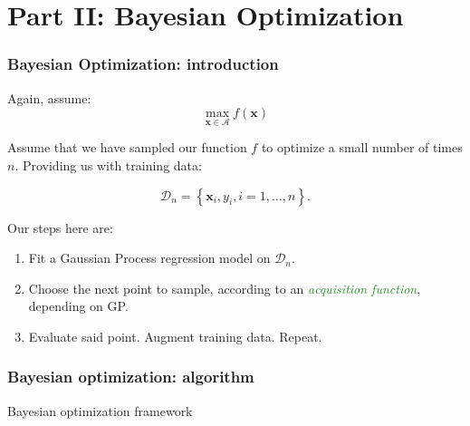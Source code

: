 \documentclass[10pt,usenames,dvipsnames]{beamer}
\DeclareMathOperator*{\argmax}{arg\,max}
\begin{document}
		\section{Part II: Bayesian Optimization}		
		
		\begin{frame}
			\frametitle{Bayesian Optimization: introduction}
			Again, assume:
			 \begin{equation}
			 \max_{\boldsymbol{x}\in \mathcal{A}} f(\boldsymbol{x})
			 \end{equation}
			 
			 Assume that we have sampled our function $f$ to optimize a small number of times $n$. Providing us with training data:

			 \begin{equation}
			 \mathcal{D}_n = \left\lbrace \boldsymbol{x}_i, y_i, i=1,\dots,n\right\rbrace.
			 \end{equation}
			 
			 Our steps here are:
			 \begin{enumerate}
			 	\item Fit a \textcolor{NavyBlue}{Gaussian Process} regression model on $\mathcal{D}_n$.
			 	\item Choose the next point to sample, according to an \textcolor{ForestGreen}{\textit{acquisition function}}, depending on GP.
			 	\item Evaluate said point. Augment training data. Repeat. 
			 \end{enumerate}
		\end{frame}
		
		\begin{frame}
			\frametitle{Bayesian optimization: algorithm}
			\begin{algorithm}[H]
				\begin{algorithmic}[1]
                                \STATE{$\boldsymbol{x}_{n+1} \gets \argmax_{\boldsymbol{x}} \alpha(\boldsymbol{x}, \mathcal{D}_n)$}
					\ENDFOR
				\end{algorithmic}
				\caption{Bayesian optimization framework}
				\label{alg:bayesopt}
			\end{algorithm}	
		\end{frame}
		
\end{document}
